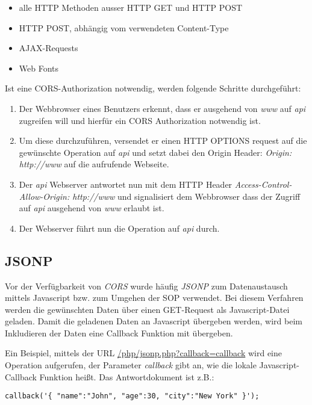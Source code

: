 \begin{itemize}
	\item alle HTTP Methoden ausser HTTP GET und HTTP POST
	\item HTTP POST, abhängig vom verwendeten Content-Type
	\item AJAX-Requests
	\item Web Fonts
\end{itemize}

Ist eine CORS-Authorization notwendig, werden folgende Schritte durchgeführt:

\begin{enumerate}
	\item Der Webbrowser eines Benutzers erkennt, dass er ausgehend von \textit{www} auf \textit{api} zugreifen will und hierfür ein CORS Authorization notwendig ist.
	\item Um diese durchzuführen, versendet er einen HTTP OPTIONS request auf die gewünschte Operation auf \textit{api} und setzt dabei den Origin Header: \textit{Origin: http://www} auf die aufrufende Webseite.
	\item Der \textit{api} Webserver antwortet nun mit dem HTTP Header \textit{Access-Control-Allow-Origin: http://www} und signalisiert dem Webbrowser dass der Zugriff auf \textit{api} ausgehend von \textit{www} erlaubt ist.
	\item Der Webserver führt nun die Operation auf \textit{api} durch.
\end{enumerate}

\subsection{JSONP}

Vor der Verfügbarkeit von \textit{CORS} wurde häufig \textit{JSONP} zum Datenaustausch mittels Javascript bzw. zum Umgehen der SOP verwendet. Bei diesem Verfahren werden die gewünschten Daten über einen GET-Request als Javascript-Datei geladen. Damit die geladenen Daten an Javascript übergeben werden, wird beim Inkludieren der Daten eine Callback Funktion mit übergeben.

Ein Beispiel, mittels der URL \url{/php/jsonp.php?callback=callback} wird eine Operation aufgerufen, der Parameter \textit{callback} gibt an, wie die lokale Javascript-Callback Funktion heißt. Das Antwortdokument ist z.B.:

\begin{verbatim}
callback('{ "name":"John", "age":30, "city":"New York" }');
\end{verbatim}

